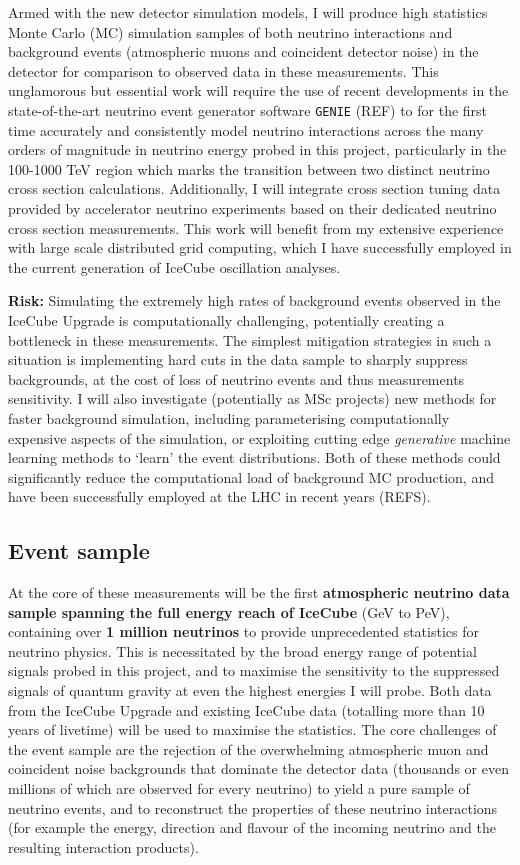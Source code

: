 \documentclass[a4paper,11pt]{article}
\begin{document}
Armed with the new detector simulation models, I will produce high statistics Monte Carlo (MC) simulation samples of both neutrino interactions and background events (atmospheric muons and coincident detector noise) in the detector for comparison to observed data in these measurements. This unglamorous but essential work will require the use of recent developments in the state-of-the-art neutrino event generator software \texttt{GENIE} (REF) to for the first time accurately and consistently model neutrino interactions across the many orders of magnitude in neutrino energy probed in this project, particularly in the 100-1000 TeV region which marks the transition between two distinct neutrino cross section calculations. Additionally, I will integrate cross section tuning data provided by accelerator neutrino experiments based on their dedicated neutrino cross section measurements. This work will benefit from my extensive experience with large scale distributed grid computing, which I have successfully employed in the current generation of IceCube oscillation analyses.

\textbf{Risk:} Simulating the extremely high rates of background events observed in the IceCube Upgrade is computationally challenging, potentially creating a bottleneck in these measurements. The simplest mitigation strategies in such a situation is implementing hard cuts in the data sample to sharply suppress backgrounds, at the cost of loss of neutrino events and thus measurements sensitivity. I will also investigate (potentially as MSc projects) new methods for faster background simulation, including parameterising computationally expensive aspects of the simulation, or exploiting cutting edge \textit{generative} machine learning methods to `learn' the event distributions. Both of these methods could significantly reduce the computational load of background MC production, and have been successfully employed at the LHC in recent years (REFS). \\


\subsection{Event sample}

At the core of these measurements will be the first \textbf{atmospheric neutrino data sample spanning the full energy reach of IceCube} (GeV to PeV), containing over \textbf{1 million neutrinos} to provide unprecedented statistics for neutrino physics. This is necessitated by the broad energy range of potential signals probed in this project, and to maximise the sensitivity to the suppressed signals of quantum gravity at even the highest energies I will probe. Both data from the IceCube Upgrade and existing IceCube data (totalling more than 10 years of livetime) will be used to maximise the statistics. The core challenges of the event sample are the rejection of the overwhelming atmospheric muon and coincident noise backgrounds that dominate the detector data (thousands or even millions of which are observed for every neutrino) to yield a pure sample of neutrino events, and to reconstruct the properties of these neutrino interactions (for example the energy, direction and flavour of the incoming neutrino and the resulting interaction products).
\end{document}
